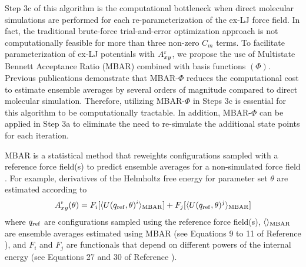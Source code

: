 \documentclass[11pt,a4paper]{article}
\begin{document}
Step 3c of this algorithm is the computational bottleneck when direct molecular simulations are performed for each re-parameterization of the ex-LJ force field. In fact, the traditional brute-force trial-and-error optimization approach is not computationally feasible for more than three non-zero $C_m$ terms. To facilitate parameterization of ex-LJ potentials with $A_{xy}^{\rm r}$, we propose the use of Multistate Bennett Acceptance Ratio (MBAR) combined with basis functions $(\Phi)$. Previous publications demonstrate that MBAR-$\Phi$ reduces the computational cost to estimate ensemble averages by several orders of magnitude compared to direct molecular simulation. Therefore, utilizing MBAR-$\Phi$ in Steps 3c is essential for this algorithm to be computationally tractable. In addition, MBAR-$\Phi$ can be applied in Step 3a to eliminate the need to re-simulate the additional state points for each iteration. 


MBAR is a statistical method that reweights configurations sampled with a reference force field(s) to predict ensemble averages for a non-simulated force field \cite{shirts-chodera:jcp:2008:mbar,Messerly2018_1}. For example, derivatives of the Helmholtz free energy for parameter set $\theta$ are estimated according to 
\begin{equation}
A_{xy}^{\rm r}(\theta) = F_i[\langle U(q_{\rm ref},\theta)^i \rangle_{\rm MBAR}] + F_j[\langle U(q_{\rm ref},\theta)^j \rangle_{\rm MBAR}]
\end{equation}
where $q_{\rm ref}$ are configurations sampled using the reference force field(s), $\langle\rangle_{\rm MBAR}$ are ensemble averages estimated using MBAR (see Equations 9 to 11 of Reference \cite{Messerly2018_1}), and $F_i$ and $F_j$ are functionals that depend on different powers of the internal energy (see Equations 27 and 30 of Reference \cite{Lustig2012}). 
\end{document}
